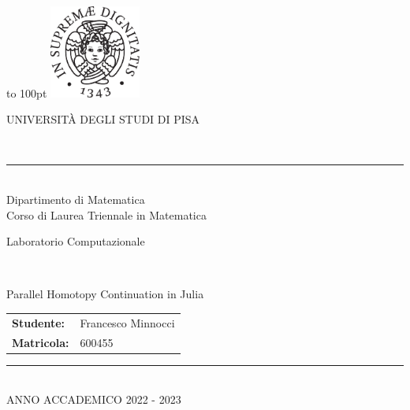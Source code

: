 \documentclass[a4paper]{article}
\theoremstyle{definition}
\theoremstyle{definition}
\theoremstyle{remark}
\theoremstyle{definition}
\begin{document}
\begin{titlepage}
    \begin{sffamily}
        \begin{large}
            \begin{center}
                \vbox to 100pt{%
                        \includegraphics[width=3cm]{cherubino}%
                        \vfil}
            \end{center}
            \begin{center}
                \begin{Large}
                    \uppercase{Universit\`a degli studi di Pisa}
                \end{Large}\\
                \rule{9cm}{.4pt}\\
                \smallskip
                Dipartimento di Matematica\\
                \medskip
                Corso di Laurea Triennale in
                Matematica\\
                \bigskip\vfill
                \begin{Large}
                    Laboratorio Computazionale
                \end{Large}\\
                \bigskip\bigskip\vfil
                \begin{Huge}
                    Parallel Homotopy Continuation in Julia
                \end{Huge}
                \bigskip\vfill
                \begin{tabular}{ll}
                    \textbf{Studente:}  & Francesco Minnocci \\
                    \textbf{Matricola:} & 600455
                \end{tabular}
            \end{center}
            \begin{center}
                \vfill
                \rule{9cm}{.4pt}\\
                \medskip
                \uppercase{Anno Accademico 2022 - 2023}\\
            \end{center}
        \end{large}
    \end{sffamily}
\end{titlepage}
\end{document}
